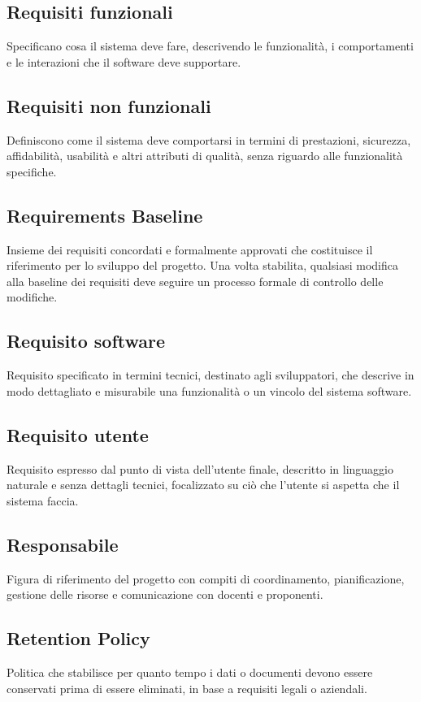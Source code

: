 \documentclass[a4paper,11pt]{article}
\begin{document}
\subsection{Requisiti funzionali}
Specificano cosa il sistema deve fare, descrivendo le funzionalità, i comportamenti e le interazioni che il software deve supportare.

\subsection{Requisiti non funzionali}
Definiscono come il sistema deve comportarsi in termini di prestazioni, sicurezza, affidabilità, usabilità e altri attributi di qualità, senza riguardo alle funzionalità specifiche.

\subsection{Requirements Baseline}
Insieme dei requisiti concordati e formalmente approvati che costituisce il riferimento per lo sviluppo del progetto. Una volta stabilita, qualsiasi modifica alla baseline dei requisiti deve seguire un processo formale di controllo delle modifiche.

\subsection{Requisito software}
Requisito specificato in termini tecnici, destinato agli sviluppatori, che descrive in modo dettagliato e misurabile una funzionalità o un vincolo del sistema software.

\subsection{Requisito utente}
Requisito espresso dal punto di vista dell'utente finale, descritto in linguaggio naturale e senza dettagli tecnici, focalizzato su ciò che l'utente si aspetta che il sistema faccia.

\subsection{Responsabile}
Figura di riferimento del progetto con compiti di coordinamento, pianificazione, gestione delle risorse e comunicazione con docenti e proponenti.

\subsection{Retention Policy}
Politica che stabilisce per quanto tempo i dati o documenti devono essere conservati prima di essere eliminati, in base a requisiti legali o aziendali.
\end{document}
